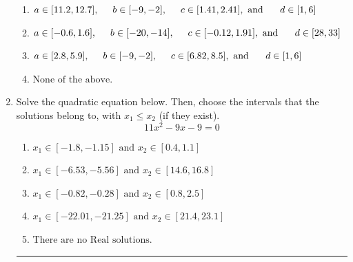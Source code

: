 \documentclass[14pt]{extbook}
\newcommand{\litem}[1]{\item#1\hspace*{-1cm}\rule{\textwidth}{0.4pt}}
\begin{document}
\begin{enumerate}
{\begin{enumerate}[label=\Alph*.]
\item \( a \in [11.2, 12.7], \hspace*{5mm} b \in [-9, -2], \hspace*{5mm} c \in [1.41, 2.41], \text{ and } \hspace*{5mm} d \in [1, 6] \)
\item \( a \in [-0.6, 1.6], \hspace*{5mm} b \in [-20, -14], \hspace*{5mm} c \in [-0.12, 1.91], \text{ and } \hspace*{5mm} d \in [28, 33] \)
\item \( a \in [2.8, 5.9], \hspace*{5mm} b \in [-9, -2], \hspace*{5mm} c \in [6.82, 8.5], \text{ and } \hspace*{5mm} d \in [1, 6] \)
\item \( \text{None of the above.} \)

\end{enumerate} }
\litem{
Solve the quadratic equation below. Then, choose the intervals that the solutions belong to, with $x_1 \leq x_2$ (if they exist).\[ 11x^{2} -9 x -9 = 0 \]\begin{enumerate}[label=\Alph*.]
\item \( x_1 \in [-1.8, -1.15] \text{ and } x_2 \in [0.4, 1.1] \)
\item \( x_1 \in [-6.53, -5.56] \text{ and } x_2 \in [14.6, 16.8] \)
\item \( x_1 \in [-0.82, -0.28] \text{ and } x_2 \in [0.8, 2.5] \)
\item \( x_1 \in [-22.01, -21.25] \text{ and } x_2 \in [21.4, 23.1] \)
\item \( \text{There are no Real solutions.} \)


\end{enumerate}}
\end{enumerate}
\end{document}
